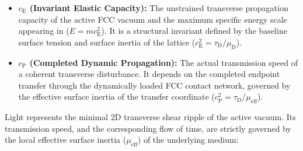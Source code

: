 \begin{itemize}
    \item \textbf{$c_{\mathrm{E}}$ (Invariant Elastic Capacity):} The unstrained transverse propagation capacity of the active FCC vacuum and the maximum specific energy scale appearing in ($E = mc_{\mathrm{E}}^2$). It is a structural invariant defined by the baseline surface tension and surface inertia of the lattice ($c_{\mathrm{E}}^2 = \tau_{\mathrm{D}} / \mu_{\mathrm{D}}$).
    \item \textbf{$c_{\mathrm{P}}$ (Completed Dynamic Propagation):} The actual transmission speed of a coherent transverse disturbance. It depends on the completed endpoint transfer through the dynamically loaded FCC contact network, governed by the effective surface inertia of the transfer coordinate ($c_{\mathrm{P}}^2 = \tau_{\mathrm{D}} / \mu_{\mathrm{eff}}$).
\end{itemize}

Light represents the minimal 2D transverse shear ripple of the active vacuum. Its transmission speed, and the corresponding flow of time, are strictly governed by the local effective surface inertia ($\mu_{\mathrm{eff}}$) of the underlying medium:

